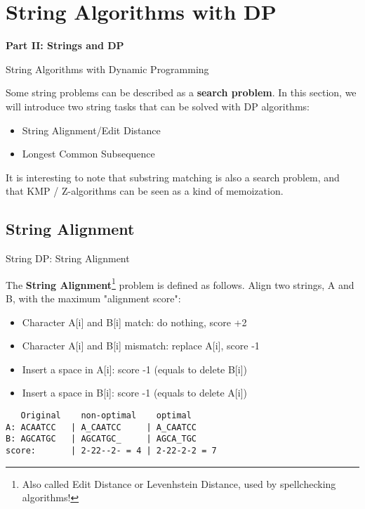 

\section{String Algorithms with DP} %

\begin{frame}
  \begin{center}
    {\bf Part II: Strings and DP}
  \end{center}
\end{frame}

\begin{frame}{String Algorithms with Dynamic Programming}
  \begin{block}{}
    Some string problems can be described as a {\bf search problem}. In this section, we will introduce two string tasks that can be solved with DP algorithms:\bigskip

    \begin{itemize}
    \item String Alignment/Edit Distance
    \item Longest Common Subsequence
    \end{itemize}
  \end{block}
  \bigskip

  It is interesting to note that substring matching is also a search problem, and that KMP / Z-algorithms can be seen as a kind of memoization.
\end{frame}

\subsection{String Alignment}
\begin{frame}[fragile]{String DP: String Alignment}

The {\bf String Alignment}\footnote{Also called Edit Distance or Levenhstein Distance, used by spellchecking algorithms!} problem is defined as follows. Align two strings, A and B, with the maximum "alignment score":\bigskip

\begin{itemize}
  \item Character A[i] and B[i] match: do nothing, score +2
  \item Character A[i] and B[i] mismatch: replace A[i], score -1
  \item Insert a space in A[i]: score -1 (equals to delete B[i])
  \item Insert a space in B[i]: score -1 (equals to delete A[i])
\end{itemize}

\begin{verbatim}
   Original    non-optimal    optimal
A: ACAATCC   | A_CAATCC     | A_CAATCC
B: AGCATGC   | AGCATGC_     | AGCA_TGC
score:       | 2-22--2- = 4 | 2-22-2-2 = 7
\end{verbatim}\bigskip
\end{frame}


